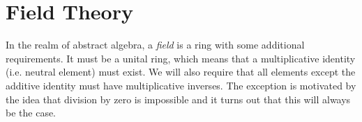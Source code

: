 \section{Field Theory}
In the realm of abstract algebra, a \emph{field} is a ring with some additional requirements. It must be a unital ring, which means that a multiplicative identity (i.e. neutral element) must exist. We will also require that all elements except the additive identity must have multiplicative inverses. The exception is motivated by the idea that division by zero is impossible and it turns out that this will always be the case. 






\begin{comment}

Explain the edge case where additive neutral elements have a multiplicative inverse. I think Michael Penn has a video about that called somethign like "when division by zero isn't ..." IIRC	

 We have used the symbol $1$ to denote the multiplicative neutral element. 

The notation $a^{-1}$ is now used for the multiplicative inverse of $a$, so we need a new notation for the additive inverse. We will use $-a$ to denote the additive inverse of $a$. In the axiom about multiplicative inverses, we have excluded the $0$ element. The additive neutral element (i.e. zero) is the only element for which we do not require to have a multiplicative inverse. It can in fact be shown that - some uninteresting trivial edge cases aside - the additive neutral element cannot possibly have a multiplicative inverse in any ring. 



Closure under multiplication: 
& $\forall a,b \in R: \; a \cdot b \in R$  \\	
Multiplication is associative: 
& $\forall a,b,c \in R: \;  (a \cdot b) \cdot c = a \cdot (b \cdot c)$   \\




	
\end{comment}